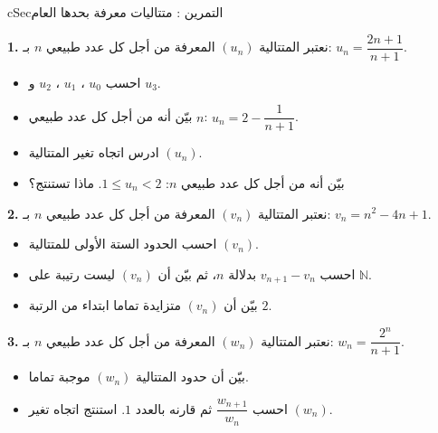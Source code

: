 \documentclass[12pt,a4paper]{article}
\newenvironment{BOX}[2]{\begin{otherlanguage}{english}\begin{arbox}{#1}{#2}}{\end{arbox}\end{otherlanguage}}
\newcounter{exo}
\newenvironment{tamrin}[1]{\stepcounter{exo}\begin{BOX}{cSec}{التمرين \theexo: #1}}{\end{BOX}}
\newcommand{\N}{\mathbb{N}}
\newenvironment{sq}{\begin{itemize}[leftmargin=2.4em,itemsep=3pt]}{\end{itemize}}
\newcommand{\qa}{\item[(أ)]}\newcommand{\qb}{\item[(ب)]}\newcommand{\qc}{\item[(جـ)]}\newcommand{\qd}{\item[(د)]}\newcommand{\qe}{\item[(هـ)]}
\newcommand{\QQ}[1]{\par\smallskip\textbf{#1.} }
\begin{document}
\begin{tamrin}{متتاليات معرفة بحدها العام}
\QQ{1} نعتبر المتتالية $(u_n)$ المعرفة من أجل كل عدد طبيعي $n$ بـ: $u_n=\dfrac{2n+1}{n+1}$.
\begin{sq}
\qa احسب $u_0$ ، $u_1$ ، $u_2$ و $u_3$.
\qb بيّن أنه من أجل كل عدد طبيعي $n$: $u_n=2-\dfrac{1}{n+1}$.
\qc ادرس اتجاه تغير المتتالية $(u_n)$.
\qd بيّن أنه من أجل كل عدد طبيعي $n$: $1\leqslant u_n<2$. ماذا تستنتج؟
\end{sq}
\QQ{2} نعتبر المتتالية $(v_n)$ المعرفة من أجل كل عدد طبيعي $n$ بـ: $v_n=n^{2}-4n+1$.
\begin{sq}
\qa احسب الحدود الستة الأولى للمتتالية $(v_n)$.
\qb احسب $v_{n+1}-v_n$ بدلالة $n$، ثم بيّن أن $(v_n)$ ليست رتيبة على $\N$.
\qc بيّن أن $(v_n)$ متزايدة تماما ابتداء من الرتبة $2$.
\end{sq}
\QQ{3} نعتبر المتتالية $(w_n)$ المعرفة من أجل كل عدد طبيعي $n$ بـ: $w_n=\dfrac{2^{n}}{n+1}$.
\begin{sq}
\qa بيّن أن حدود المتتالية $(w_n)$ موجبة تماما.
\qb احسب $\dfrac{w_{n+1}}{w_n}$ ثم قارنه بالعدد $1$. استنتج اتجاه تغير $(w_n)$.
\end{sq}
\end{tamrin}
\end{document}
